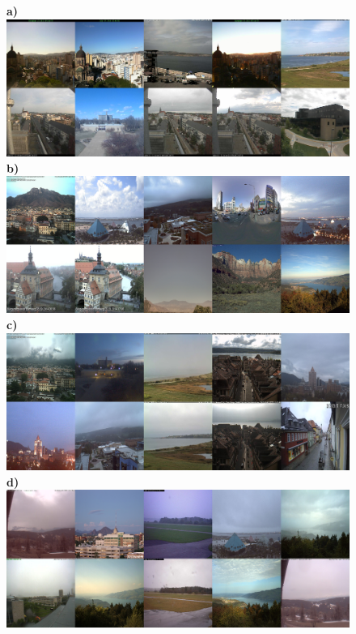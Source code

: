 \documentclass{article}
\begin{document}
\begin{figure}
\centering
\textbf{\scriptsize{a)}}\includegraphics[trim = 0mm 0mm 0mm 0mm,clip,scale=0.14]{Images/13-0_Mean_7_8_300_tiles.png}
\textbf{\scriptsize{b)}}\includegraphics[trim = 0mm 0mm 0mm 0mm,clip,scale=0.14]{Images/13-3_Mean_7_6_100_tiles.png}
\textbf{\scriptsize{c)}}\includegraphics[trim = 0mm 0mm 0mm 0mm,clip,scale=0.14]{Images/13-5_K-mean_6_tiles.png}
\textbf{\scriptsize{d)}}\includegraphics[trim = 0mm 0mm 0mm 0mm,clip,scale=0.14]{Images/13-9_Sobel_70_tiles.png}
\end{figure}
\clearpage
\end{document}
